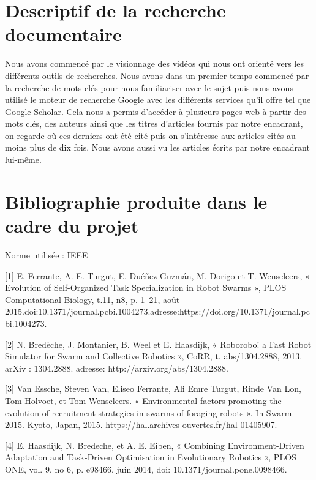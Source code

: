 \documentclass[11pt]{article}
\begin{document}
\begin{flushleft}
\section{Descriptif de la recherche documentaire}
Nous avons commencé par le visionnage des vidéos qui nous ont orienté vers les différents outils de recherches. Nous avons dans un premier temps commencé par la recherche de mots clés pour nous familiariser avec le sujet puis nous avons utilisé le moteur de recherche Google avec les différents services qu'il offre tel que Google Scholar. Cela nous a permis d'accéder à plusieurs pages web à partir des mots clés, des auteurs ainsi que les titres d'articles fournis par notre encadrant, on regarde où ces derniers ont été cité puis on s'intéresse aux articles cités au moins plus de dix fois. Nous avons aussi vu les articles écrits par notre encadrant lui-même.

\section{Bibliographie produite dans le cadre du projet}
Norme utilisée : IEEE 

\vspace*{7mm}

[1] E. Ferrante, A. E. Turgut, E. Duéñez-Guzmán, M. Dorigo et T. Wenseleers, « Evolution of Self-Organized Task Specialization in Robot Swarms », PLOS Computational Biology, t.11, n8, p. 1–21, août 2015.doi:10.1371/journal.pcbi.1004273.adresse:https://doi.org/10.1371/journal.pcbi.1004273.
\vspace*{7mm}

[2] N. Bredèche, J. Montanier, B. Weel et E. Haasdijk, « Roborobo! a Fast Robot    Simulator for Swarm and Collective Robotics », CoRR, t. abs/1304.2888, 2013. arXiv : 1304.2888. adresse: http://arxiv.org/abs/1304.2888.
\vspace*{7mm}

[3]  Van Essche, Steven Van, Eliseo Ferrante, Ali Emre Turgut, Rinde Van Lon, Tom Holvoet, et Tom Wenseleers. « Environmental factors promoting the evolution of recruitment strategies in swarms of foraging robots ». In Swarm 2015. Kyoto, Japan, 2015. https://hal.archives-ouvertes.fr/hal-01405907.
\vspace*{7mm}

[4] E. Haasdijk, N. Bredeche, et A. E. Eiben, « Combining Environment-Driven Adaptation and Task-Driven Optimisation in Evolutionary Robotics », PLOS ONE, vol. 9, no 6, p. e98466, juin 2014, doi: 10.1371/journal.pone.0098466.
\vspace*{7mm}


\end{flushleft}
\end{document}
